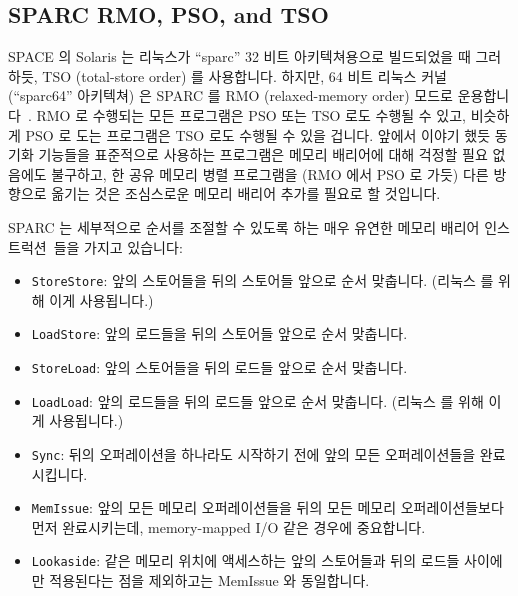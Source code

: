 \subsection{SPARC RMO, PSO, and TSO}

SPACE 의 Solaris 는 리눅스가 ``sparc'' 32 비트 아키텍쳐용으로 빌드되었을 때
그러하듯, TSO (total-store order) 를 사용합니다.
하지만, 64 비트 리눅스 커널 (``sparc64'' 아키텍쳐) 은 SPARC 를 RMO
(relaxed-memory order) 모드로 운용합니다~\cite{SPARC94}.
RMO 로 수행되는 모든 프로그램은 PSO 또는 TSO 로도 수행될 수 있고, 비슷하게 PSO
로 도는 프로그램은 TSO 로도 수행될 수 있을 겁니다.
앞에서 이야기 했듯 동기화 기능들을 표준적으로 사용하는 프로그램은 메모리
배리어에 대해 걱정할 필요 없음에도 불구하고, 한 공유 메모리 병렬 프로그램을
(RMO 에서 PSO 로 가듯) 다른 방향으로 옮기는 것은 조심스로운 메모리 배리어
추가를 필요로 할 것입니다.

SPARC 는 세부적으로 순서를 조절할 수 있도록 하는 매우 유연한 메모리 배리어
인스트럭션~\cite{SPARC94}들을 가지고 있습니다:
\begin{itemize}
\item	{\tt StoreStore}: 앞의 스토어들을 뒤의 스토어들 앞으로 순서 맞춥니다.
	(리눅스  를 위해 이게 사용됩니다.)
\item	{\tt LoadStore}: 앞의 로드들을 뒤의 스토어들 앞으로 순서 맞춥니다.
\item	{\tt StoreLoad}: 앞의 스토어들을 뒤의 로드들 앞으로 순서 맞춥니다.
\item	{\tt LoadLoad}: 앞의 로드들을 뒤의 로드들 앞으로 순서 맞춥니다.
	(리눅스  를 위해 이게 사용됩니다.)
\item	{\tt Sync}: 뒤의 오퍼레이션을 하나라도 시작하기 전에 앞의 모든
	오퍼레이션들을 완료시킵니다.
\item	{\tt MemIssue}: 앞의 모든 메모리 오퍼레이션들을 뒤의 모든 메모리
	오퍼레이션들보다 먼저 완료시키는데, memory-mapped I/O 같은 경우에
	중요합니다.
\item	{\tt Lookaside}: 같은 메모리 위치에 액세스하는 앞의 스토어들과 뒤의
	로드들 사이에만 적용된다는 점을 제외하고는 MemIssue 와 동일합니다.
\end{itemize}
\iffalse

